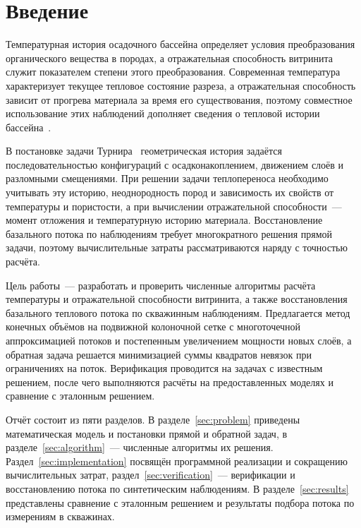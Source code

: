 \section*{Введение}
\label{sec:introduction}

Температурная история осадочного бассейна определяет условия преобразования органического вещества в породах, а отражательная способность витринита служит показателем степени этого преобразования. Современная температура характеризует текущее тепловое состояние разреза, а отражательная способность зависит от прогрева материала за время его существования, поэтому совместное использование этих наблюдений дополняет сведения о тепловой истории бассейна~\cite{hantschel2009,sweeney1990}.

В постановке задачи Турнира~\cite{problem2026} геометрическая история задаётся последовательностью конфигураций с осадконакоплением, движением слоёв и разломными смещениями. При решении задачи теплопереноса необходимо учитывать эту историю, неоднородность пород и зависимость их свойств от температуры и пористости, а при вычислении отражательной способности~--- момент отложения и температурную историю материала. Восстановление базального потока по наблюдениям требует многократного решения прямой задачи, поэтому вычислительные затраты рассматриваются наряду с точностью расчёта.

Цель работы~--- разработать и проверить численные алгоритмы расчёта температуры и отражательной способности витринита, а также восстановления базального теплового потока по скважинным наблюдениям. Предлагается метод конечных объёмов на подвижной колоночной сетке с многоточечной аппроксимацией потоков и постепенным увеличением мощности новых слоёв, а обратная задача решается минимизацией суммы квадратов невязок при ограничениях на поток. Верификация проводится на задачах с известным решением, после чего выполняются расчёты на предоставленных моделях и сравнение с эталонным решением.

Отчёт состоит из пяти разделов. В разделе~\ref{sec:problem} приведены математическая модель и постановки прямой и обратной задач, в разделе~\ref{sec:algorithm}~--- численные алгоритмы их решения. Раздел~\ref{sec:implementation} посвящён программной реализации и сокращению вычислительных затрат, раздел~\ref{sec:verification}~--- верификации и восстановлению потока по синтетическим наблюдениям. В разделе~\ref{sec:results} представлены сравнение с эталонным решением и результаты подбора потока по измерениям в скважинах.

